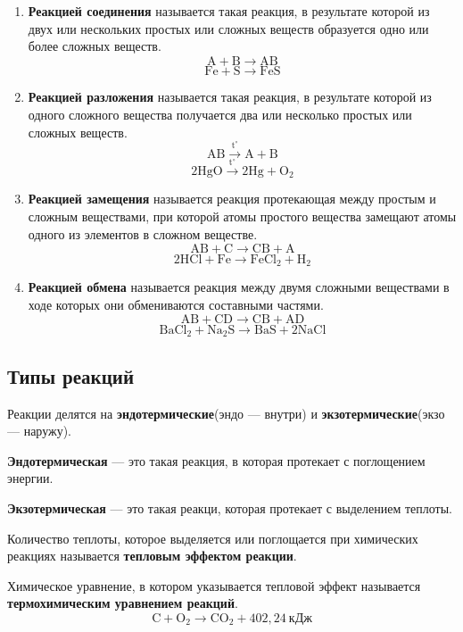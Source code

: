 \documentclass[12pt,a4paper]{article}
\begin{document}
\begin{enumerate}
\item {\bfseries Реакцией соединения} называется такая реакция, в результате которой из двух или нескольких простых или сложных веществ образуется одно или более сложных веществ.
	$$\mathrm{ A + B \xrightarrow{} AB }$$
	$$\mathrm{ Fe + S \xrightarrow{} FeS }$$

\item {\bfseries Реакцией разложения} называется такая реакция, в результате которой из одного сложного вещества получается два или несколько простых или сложных веществ.
	$$\mathrm{ AB \xrightarrow{t^{\circ}} A + B }$$
	$$\mathrm{ 2Hg O \xrightarrow{t^{\circ}} 2Hg + O_2 }$$
	 
\item {\bfseries Реакцией замещения} называется реакция протекающая между простым и сложным веществами, при которой атомы простого вещества замещают атомы одного из элементов в сложном веществе.
	$$\mathrm{ AB + C \xrightarrow{} CB + A }$$
	$$\mathrm{ 2H Cl + Fe \xrightarrow{} Fe Cl_2 + H_2 }$$

\item {\bfseries Реакцией обмена} называется реакция между двумя сложными веществами в ходе которых они обмениваются составными частями.
	$$\mathrm{ AB + CD \xrightarrow{} CB + AD }$$
	$$\mathrm{ Ba Cl_2 + Na_2 S \xrightarrow{} Ba S + 2Na Cl }$$

\end{enumerate}


\subsection{Типы реакций}

Реакции делятся на {\bfseries эндотермические}(эндо --- внутри) и {\bfseries экзотермические}(экзо --- наружу).

{\bfseries Эндотермическая} --- это такая реакция, в которая протекает с поглощением энергии.

{\bfseries Экзотермическая} --- это такая реакци, которая протекает с выделением теплоты.

Количество теплоты, которое выделяется или поглощается при химических реакциях называется {\bfseries тепловым эффектом реакции}.

Химическое уравнение, в котором указывается тепловой эффект называется {\bfseries термохимическим уравнением реакций}.
	$$\mathrm{ C + O_2 \xrightarrow{} C O_2 + 402,24\ \text{кДж} }$$
	
\end{document}
